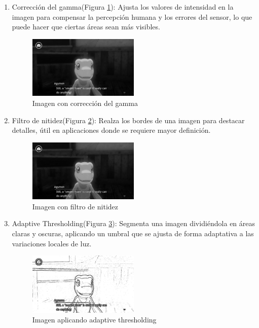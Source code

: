 \begin{enumerate}
	\item Corrección del gamma(Figura \ref{fig:Gamma}):
	Ajusta los valores de intensidad en la imagen para compensar la percepción humana y los errores del sensor, lo que puede hacer que ciertas áreas sean más visibles.
	\begin{figure}[H]
		\centering
		\includegraphics[width = 0.5\textwidth]{Imagenes/Preprocesado/4.png}
		\caption{Imagen con corrección del gamma}
		\label{fig:Gamma}
	\end{figure}
	
	\item Filtro de nitidez(Figura \ref{fig:F.Nitidez}): 
	Realza los bordes de una imagen para destacar detalles, útil en aplicaciones donde se requiere mayor definición.
	\begin{figure}[H]
		\centering
		\includegraphics[width = 0.5\textwidth]{Imagenes/Preprocesado/5.png}
		\caption{Imagen con filtro de nitidez}
		\label{fig:F.Nitidez}
	\end{figure}
	
	\item Adaptive Thresholding(Figura \ref{fig:Thresholding}):
	Segmenta una imagen dividiéndola en áreas claras y oscuras, aplicando un umbral que se ajusta de forma adaptativa a las variaciones locales de luz.
	\begin{figure}[H]
		\centering
		\includegraphics[width = 0.5\textwidth]{Imagenes/Preprocesado/6.png}
		\caption{Imagen aplicando adaptive thresholding}
		\label{fig:Thresholding}
	\end{figure}
	

\end{enumerate}
